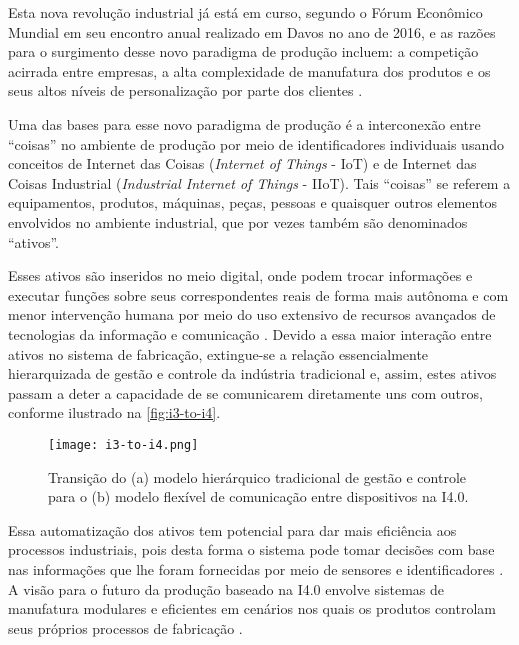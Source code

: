 Esta nova revolução industrial já está em curso, segundo o Fórum Econômico Mundial \cite{schwab2016fourth} em seu encontro anual realizado em Davos no ano de 2016, e as razões para o surgimento desse novo paradigma de produção incluem: a competição acirrada entre empresas, a alta complexidade de manufatura dos produtos e os seus altos níveis de personalização por parte dos clientes \cite{bordeleau2018bi, vaidya2018industryfour}.

Uma das bases para esse novo paradigma de produção é a interconexão entre ``coisas'' no ambiente de produção por meio de identificadores individuais usando conceitos de Internet das Coisas (\textit{Internet of Things} - IoT) e de Internet das Coisas Industrial (\textit{Industrial Internet of Things} - IIoT). Tais ``coisas'' se referem a equipamentos, produtos, máquinas, peças, pessoas e quaisquer outros elementos envolvidos no ambiente industrial, que por vezes também são denominados ``ativos''.

Esses ativos são inseridos no meio digital, onde podem trocar informações e executar funções sobre seus correspondentes reais de forma mais autônoma e com menor intervenção humana por meio do uso extensivo de recursos avançados de tecnologias da informação e comunicação \cite{adolph2018roadmap}. Devido a essa maior interação entre ativos no sistema de fabricação, extingue-se a relação essencialmente hierarquizada de gestão e controle da indústria tradicional e, assim, estes ativos passam a deter a capacidade de se comunicarem diretamente uns com outros, conforme ilustrado na \autoref{fig:i3-to-i4}.

\begin{figure}[htb]
	\centering
	\texttt{[image: i3-to-i4.png]}
	\caption{Transição do (a) modelo hierárquico tradicional de gestão e controle para o (b) modelo flexível de comunicação entre dispositivos na I4.0.}
	\label{fig:i3-to-i4}
\end{figure}

Essa automatização dos ativos tem potencial para dar mais eficiência aos processos industriais, pois desta forma o sistema pode tomar decisões com base nas informações que lhe foram fornecidas por meio de sensores e identificadores \cite{schmittner2017mtom}. A visão para o futuro da produção baseado na I4.0 envolve sistemas de manufatura modulares e eficientes em cenários nos quais os produtos controlam seus próprios processos de fabricação \cite{lasi2014industryfour}.

